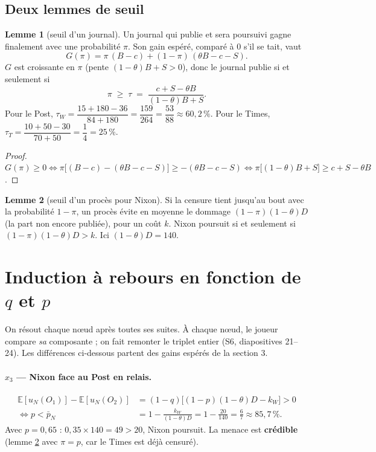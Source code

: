 \documentclass[11pt,a4paper]{article}
\theoremstyle{definition}
\newtheorem{lemme}{Lemme}
\newcommand{\E}{\mathbb{E}}
\begin{document}
\subsection{Deux lemmes de seuil}
\begin{lemme}[seuil d'un journal]\label{lem:journal}
Un journal qui publie et sera poursuivi gagne finalement avec une probabilité $\pi$. Son gain espéré, comparé à $0$ s'il se tait, vaut
\[
G(\pi)=\pi\,(B-c)+(1-\pi)\,(\theta B-c-S).
\]
$G$ est croissante en $\pi$ (pente $(1-\theta)B+S>0$), donc le journal publie si et seulement si
\[
\pi\;\ge\;\tau\;=\;\frac{c+S-\theta B}{(1-\theta)B+S}.
\]
Pour le Post, $\tau_W=\dfrac{15+180-36}{84+180}=\dfrac{159}{264}=\dfrac{53}{88}\approx60,2\,\%$. Pour le Times, $\tau_T=\dfrac{10+50-30}{70+50}=\dfrac14=25\,\%$.
\end{lemme}
\begin{proof}
$G(\pi)\ge0 \iff \pi\big[(B-c)-(\theta B-c-S)\big]\ge-(\theta B-c-S) \iff \pi\big[(1-\theta)B+S\big]\ge c+S-\theta B$.
\end{proof}

\begin{lemme}[seuil d'un procès pour Nixon]\label{lem:nixon}
Si la censure tient jusqu'au bout avec la probabilité $1-\pi$, un procès évite en moyenne le dommage $(1-\pi)(1-\theta)D$ (la part non encore publiée), pour un coût $k$. Nixon poursuit si et seulement si $(1-\pi)(1-\theta)D>k$. Ici $(1-\theta)D=140$.
\end{lemme}

\section{Induction à rebours en fonction de $q$ et $p$}
On résout chaque nœud après toutes ses suites. À chaque nœud, le joueur compare \emph{sa} composante ; on fait remonter le triplet entier (S6, diapositives 21--24). Les différences ci-dessous partent des gains espérés de la section 3.

\paragraph{$x_3$ — Nixon face au Post en relais.}
\begin{align*}
\E[u_N(O_1)]-\E[u_N(O_2)]&=(1-q)\big[(1-p)(1-\theta)D-k_W\big]>0\\
\iff p<\bar p_N&=1-\frac{k_W}{(1-\theta)D}=1-\frac{20}{140}=\frac67\approx85,7\,\%.
\end{align*}
Avec $p=0,65$ : $0,35\times140=49>20$, Nixon poursuit. La menace est \textbf{crédible} (lemme \ref{lem:nixon} avec $\pi=p$, car le Times est déjà censuré).
\end{document}
